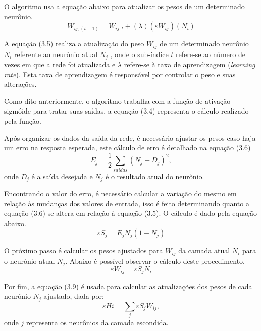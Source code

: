 O algoritmo usa a equação abaixo para atualizar os pesos de um determinado neurônio.
\begin{equation}\label{eq:backpropagation-ajuste-pesos}
W_{ij,(t+1)} = W_{ij, t} + (\lambda)(\varepsilon W_{ij})(N_i)
\end{equation}

A equação (3.5) realiza a atualização do peso $W_{ij}$ de um determinado neurônio $N_i$ referente ao neurônio atual $N_j$ , onde o sub-índice $t$ refere-se ao número de vezes em que a rede foi atualizada e $\lambda$ refere-se à taxa de aprendizagem (\textit{learning rate}). Esta taxa de aprendizagem é responsável por controlar o peso e suas alterações.

Como dito anteriormente, o algoritmo trabalha com a função de ativação sigmóide para tratar suas saídas, a equação (3.4) representa o cálculo realizado pela função.

Após organizar os dados da saída da rede, é necessário ajustar os pesos caso haja um erro na resposta esperada, este cálculo de erro é detalhado na equação (3.6)
\begin{equation}\label{eq:backpropagation-calculo-erro}
E_j = \frac{1}{2} \sum_{saidas} (N_j - D_j)^2,
\end{equation}
onde $D_j$ é a saída desejada e $N_j$ é o resultado atual do neurônio. 	

Encontrando o valor do erro, é necessário calcular a variação do mesmo em relação às mudanças dos valores de entrada, isso é feito determinando quanto a equação (3.6) se altera em relação à equação (3.5). O cálculo é dado pela equação abaixo.
\begin{equation}\label{eq:backpropagation-calculo-erro-diferença}
\varepsilon S_{j} = E_j N_j (1 - N_j)
\end{equation}

O próximo passo é calcular os pesos ajustados para $W_{ij}$ da camada atual $N_i$ para o neurônio atual $N_j$. Abaixo é possível observar o cálculo deste procedimento.
\begin{equation}\label{eq:backpropagation-ajustes-erro}
\varepsilon W_{ij} = \varepsilon S_j N_i
\end{equation}

Por fim, a equação (3.9) é usada para calcular as atualizações dos pesos de cada neurônio $N_j$ ajustado, dada por:
\begin{equation}\label{eq:backpropagation-ajustes-erro-propagacao}
\varepsilon Hi = \sum_{j} \varepsilon S_{j}W_{ij},
\end{equation}
onde $j$ representa os neurônios da camada escondida.

